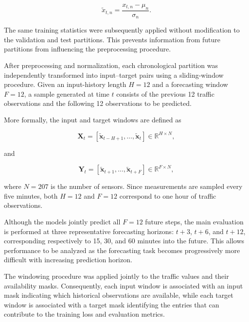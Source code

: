 \begin{equation}
    \tilde{x}_{t,n}
    =
    \frac{x_{t,n}-\mu_n}{\sigma_n}.
    \label{eq:normalization}
\end{equation}

The same training statistics were subsequently applied without modification
to the validation and test partitions. This prevents information from future
partitions from influencing the preprocessing procedure.

After preprocessing and normalization, each chronological partition was
independently transformed into input--target pairs using a sliding-window
procedure. Given an input-history length $H=12$ and a forecasting window
$F=12$, a sample generated at time $t$ consists of the previous 12 traffic
observations and the following 12 observations to be predicted.

More formally, the input and target windows are defined as

\begin{equation}
    \mathbf{X}_t
    =
    \left[
        \tilde{\mathbf{x}}_{t-H+1},
        \ldots,
        \tilde{\mathbf{x}}_{t}
    \right]
    \in \mathbb{R}^{H \times N},
    \label{eq:input_window}
\end{equation}

and

\begin{equation}
    \mathbf{Y}_t
    =
    \left[
        \tilde{\mathbf{x}}_{t+1},
        \ldots,
        \tilde{\mathbf{x}}_{t+F}
    \right]
    \in \mathbb{R}^{F \times N},
    \label{eq:target_window}
\end{equation}

where $N=207$ is the number of sensors. Since measurements are sampled every
five minutes, both $H=12$ and $F=12$ correspond to one hour of traffic
observations.


Although the models jointly predict all $F=12$ future steps, the main
evaluation is performed at three representative forecasting horizons:
$t+3$, $t+6$, and $t+12$, corresponding respectively to 15, 30, and
60 minutes into the future. This allows performance to be analyzed as the
forecasting task becomes progressively more difficult with increasing
prediction horizon.


The windowing procedure was applied jointly to the traffic values and their
availability masks. Consequently, each input window is associated with an
input mask indicating which historical observations are available, while
each target window is associated with a target mask identifying the entries
that can contribute to the training loss and evaluation metrics.

